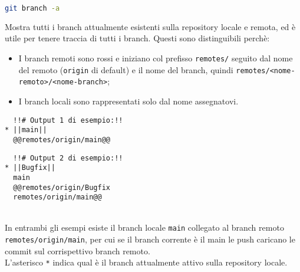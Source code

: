 \begin{lstlisting}[language=bash]
	git branch -a
\end{lstlisting}
Mostra tutti i branch attualmente esistenti sulla repository locale e remota, ed è utile per tenere traccia di tutti i branch. Questi sono distinguibili perchè:
\begin{itemize}[noitemsep, topsep=3pt]
	\item I branch remoti sono rossi e iniziano col prefisso \texttt{remotes/} seguito dal nome del remoto (\texttt{origin} di default) e il nome del branch, quindi \texttt{remotes/<nome-remoto>/<nome-branch>};
	\item I branch locali sono rappresentati solo dal nome assegnatovi.\\
\end{itemize}
\begin{minipage}{.45\textwidth}
\begin{lstlisting}
  !!# Output 1 di esempio:!!
* ||main||
  @@remotes/origin/main@@
\end{lstlisting}
\end{minipage}
\hfill
\begin{minipage}{.45\textwidth}
\begin{lstlisting}
  !!# Output 2 di esempio:!!
* ||Bugfix||
  main
  @@remotes/origin/Bugfix
  remotes/origin/main@@
\end{lstlisting}
\end{minipage}\\
In entrambi gli esempi esiste il branch locale \texttt{\color{green!48!black}main} collegato al branch remoto \texttt{\color{red}remotes/origin/main}, per cui se il branch corrente è il main le push caricano le commit sul corrispettivo branch remoto.\\
L'asterisco \texttt{*} indica qual è il branch attualmente attivo sulla repository locale.\\

